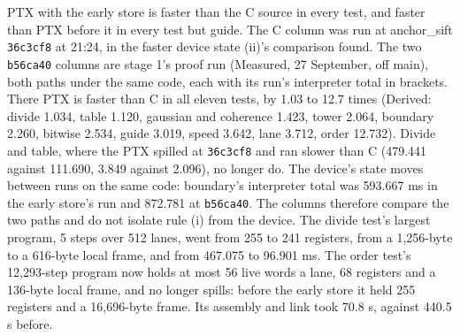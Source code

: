 \begin{enumerate}
\begin{itemize}
\begin{enumerate}
\begin{itemize}
PTX with the early store is faster than the C source in every test, and faster than PTX before it in every test but guide. The C column was run at anchor\_\allowbreak{}sift \texttt{36c3cf8} at 21:24, in the faster device state (ii)'s comparison found. The two \texttt{b56ca40} columns are stage 1's proof run (Measured, 27 September, off main), both paths under the same code, each with its run's interpreter total in brackets. There PTX is faster than C in all eleven tests, by 1.03 to 12.7 times (Derived: divide 1.034, table 1.120, gaussian and coherence 1.423, tower 2.064, boundary 2.260, bitwise 2.534, guide 3.019, speed 3.642, lane 3.712, order 12.732). Divide and table, where the PTX spilled at \texttt{36c3cf8} and ran slower than C (479.441 against 111.690, 3.849 against 2.096), no longer do. The device's state moves between runs on the same code: boundary's interpreter total was 593.667 ms in the early store's run and 872.781 at \texttt{b56ca40}. The columns therefore compare the two paths and do not isolate rule (i) from the device. The divide test's largest program, 5 steps over 512 lanes, went from 255 to 241 registers, from a 1,256-byte to a 616-byte local frame, and from 467.075 to 96.901 ms. The order test's 12,293-step program now holds at most 56 live words a lane, 68 registers and a 136-byte local frame, and no longer spills: before the early store it held 255 registers and a 16,696-byte frame. Its assembly and link took 70.8 s, against 440.5 s before.


\end{itemize}
\end{enumerate}
\end{itemize}
\end{enumerate}
